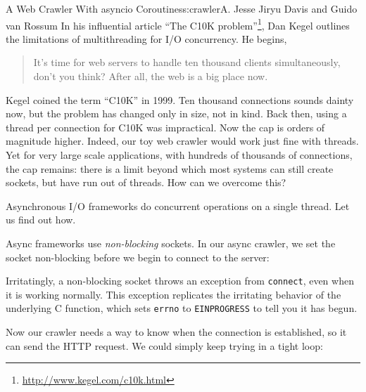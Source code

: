 \begin{aosachapter}{A Web Crawler With asyncio Coroutines}{s:crawler}{A. Jesse Jiryu Davis and Guido van Rossum}
In his influential article ``The C10K problem''\footnote{\url{http://www.kegel.com/c10k.html}},
Dan Kegel outlines the limitations of multithreading for I/O
concurrency. He begins,

\begin{quote}
It's time for web servers to handle ten thousand clients simultaneously,
don't you think? After all, the web is a big place now.
\end{quote}

Kegel coined the term ``C10K'' in 1999. Ten thousand connections sounds
dainty now, but the problem has changed only in size, not in kind. Back
then, using a thread per connection for C10K was impractical. Now the
cap is orders of magnitude higher. Indeed, our toy web crawler would
work just fine with threads. Yet for very large scale applications, with
hundreds of thousands of connections, the cap remains: there is a limit
beyond which most systems can still create sockets, but have run out of
threads. How can we overcome this?

\label{async}

Asynchronous I/O frameworks do concurrent operations on a single thread.
Let us find out how.

Async frameworks use \emph{non-blocking} sockets. In our async crawler,
we set the socket non-blocking before we begin to connect to the server:

\begin{Shaded}
\begin{Highlighting}[]
\NormalTok{)}
\NormalTok{:}
    \NormalTok{((}\NormalTok{, }\NormalTok{))}
 \NormalTok{:}
\end{Highlighting}
\end{Shaded}

Irritatingly, a non-blocking socket throws an exception from
\texttt{connect}, even when it is working normally. This exception
replicates the irritating behavior of the underlying C function, which
sets \texttt{errno} to \texttt{EINPROGRESS} to tell you it has begun.

Now our crawler needs a way to know when the connection is established,
so it can send the HTTP request. We could simply keep trying in a tight
loop:

\begin{Shaded}
\begin{Highlighting}[]
\NormalTok{)}


\end{Highlighting}
\end{Shaded}
\end{aosachapter}
